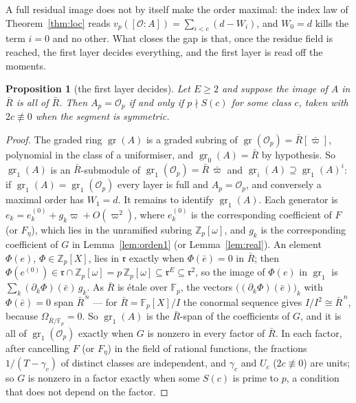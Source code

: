 \documentclass[11pt,a4paper]{article}
\newtheorem{proposition}[theorem]{Proposition}
\theoremstyle{definition}
\newcommand{\ZZ}{\mathbb{Z}}
\newcommand{\FF}{\mathbb{F}}
\newcommand{\cO}{\mathcal{O}}
\newcommand{\rad}{\mathfrak{r}}
\newcommand{\gr}{\operatorname{gr}}
\begin{document}
A full residual image does not by itself make the order maximal: the index law of
Theorem~\ref{thm:loc} reads $v_p([\cO:A])=\sum_{i<e}(d-W_i)$, and $W_0=d$ kills the term $i=0$ and
no other. What closes the gap is that, once the residue field is reached, the first layer decides
everything, and the first layer is read off the moments.

\begin{proposition}[the first layer decides]\label{prop:tangente}
Let $E\ge2$ and suppose the image of $A$ in $\bar R$ is all of $\bar R$. Then $A_p=\cO_p$ if and
only if $p\nmid S(c)$ for some class $c$, taken with $2c\not\equiv0$ when the segment is symmetric.
\end{proposition}

\begin{proof}
The graded ring $\gr(A)$ is a graded subring of $\gr(\cO_p)=\bar R[\bar\varpi]$, polynomial in the
class of a uniformiser, and $\gr_0(A)=\bar R$ by hypothesis. So $\gr_1(A)$ is an $\bar R$-submodule
of $\gr_1(\cO_p)=\bar R\,\bar\varpi$ and $\gr_i(A)\supseteq\gr_1(A)^i$: if $\gr_1(A)=\gr_1(\cO_p)$
every layer is full and $A_p=\cO_p$, and conversely a maximal order has $W_1=d$. It remains to
identify $\gr_1(A)$. Each generator is $e_k=e_k^{(0)}+g_k\varpi+O(\varpi^2)$, where $e_k^{(0)}$ is
the corresponding coefficient of $F$ (or $F_\eta$), which lies in the unramified subring
$\ZZ_p[\omega]$, and $g_k$ is the corresponding coefficient of $G$ in Lemma~\ref{lem:orden1} (or
Lemma~\ref{lem:real}). An element $\Phi(e)$, $\Phi\in\ZZ_p[X]$, lies in $\rad$ exactly when
$\Phi(\bar e)=0$ in $\bar R$; then $\Phi(e^{(0)})\in\rad\cap\ZZ_p[\omega]=p\,\ZZ_p[\omega]
\subseteq\rad^E\subseteq\rad^2$, so the image of $\Phi(e)$ in $\gr_1$ is
$\sum_k(\partial_k\Phi)(\bar e)\,g_k$. As $\bar R$ is \'etale over $\FF_p$, the vectors
$\bigl((\partial_k\Phi)(\bar e)\bigr)_k$ with $\Phi(\bar e)=0$ span $\bar R^{\,n}$ --- for
$\bar R=\FF_p[X]/I$ the conormal sequence gives $I/I^2\cong\bar R^{\,n}$, because
$\Omega_{\bar R/\FF_p}=0$. So $\gr_1(A)$ is the $\bar R$-span of the coefficients of $G$, and it is
all of $\gr_1(\cO_p)$ exactly when $G$ is nonzero in every factor of $\bar R$. In each factor,
after cancelling $F$ (or $F_\eta$) in the field of rational functions, the fractions $1/(T-\gamma_c)$
of distinct classes are independent, and $\gamma_c$ and $U_c$ ($2c\not\equiv0$) are units; so $G$
is nonzero in a factor exactly when some $S(c)$ is prime to $p$, a condition that does not depend
on the factor.
\end{proof}
\end{document}
